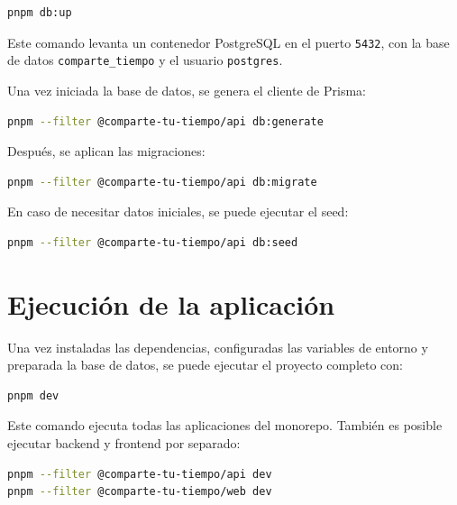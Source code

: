 \begin{lstlisting}[language=bash, caption={Arranque de PostgreSQL con Docker}, label={lst:manual_instalacion_db_up}]
pnpm db:up
\end{lstlisting}

Este comando levanta un contenedor PostgreSQL en el puerto \texttt{5432}, con la base de datos \texttt{comparte\_tiempo} y el usuario \texttt{postgres}.

Una vez iniciada la base de datos, se genera el cliente de Prisma:

\begin{lstlisting}[language=bash, caption={Generación del cliente Prisma}, label={lst:manual_instalacion_prisma_generate}]
pnpm --filter @comparte-tu-tiempo/api db:generate
\end{lstlisting}

Después, se aplican las migraciones:

\begin{lstlisting}[language=bash, caption={Ejecución de migraciones}, label={lst:manual_instalacion_migrate}]
pnpm --filter @comparte-tu-tiempo/api db:migrate
\end{lstlisting}

En caso de necesitar datos iniciales, se puede ejecutar el seed:

\begin{lstlisting}[language=bash, caption={Ejecución opcional de seed}, label={lst:manual_instalacion_seed}]
pnpm --filter @comparte-tu-tiempo/api db:seed
\end{lstlisting}

\section{Ejecución de la aplicación}

Una vez instaladas las dependencias, configuradas las variables de entorno y preparada la base de datos, se puede ejecutar el proyecto completo con:

\begin{lstlisting}[language=bash, caption={Ejecución completa del monorepo}, label={lst:manual_instalacion_run_all}]
pnpm dev
\end{lstlisting}

Este comando ejecuta todas las aplicaciones del monorepo. También es posible ejecutar backend y frontend por separado:

\begin{lstlisting}[language=bash, caption={Ejecución por separado de backend y frontend}, label={lst:manual_instalacion_run_separado}]
pnpm --filter @comparte-tu-tiempo/api dev
pnpm --filter @comparte-tu-tiempo/web dev
\end{lstlisting}

